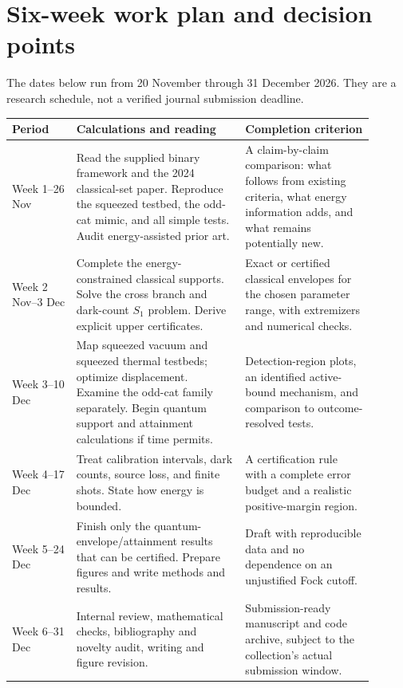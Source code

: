 \documentclass[11pt,a4paper]{article}
\begin{document}
\section{Six-week work plan and decision points}
The dates below run from 20 November through 31 December 2026. They are a
research schedule, not a verified journal submission deadline.

\begin{longtable}{>{\raggedright\arraybackslash}p{0.16\linewidth}>{\raggedright\arraybackslash}p{0.42\linewidth}>{\raggedright\arraybackslash}p{0.32\linewidth}}
\toprule
Period & Calculations and reading & Completion criterion\\
\midrule
\endhead
Week 1\newline 20--26 Nov & Read the supplied binary framework and the 2024
classical-set paper. Reproduce the squeezed testbed, the odd-cat mimic, and all
simple tests. Audit energy-assisted prior art. & A claim-by-claim comparison:
what follows from existing criteria, what energy information adds, and what
remains potentially new.\\
Week 2\newline 27 Nov--3 Dec & Complete the energy-constrained classical
supports. Solve the cross branch and dark-count $S_1$ problem. Derive explicit
upper certificates. & Exact or certified classical envelopes for the chosen
parameter range, with extremizers and numerical checks.\\
Week 3\newline 4--10 Dec & Map squeezed vacuum and squeezed thermal testbeds;
optimize displacement. Examine the odd-cat family separately. Begin quantum
support and attainment calculations if time permits. & Detection-region plots,
an identified active-bound mechanism, and comparison to outcome-resolved tests.\\
Week 4\newline 11--17 Dec & Treat calibration intervals, dark counts, source
loss, and finite shots. State how energy is bounded. & A certification rule
with a complete error budget and a realistic positive-margin region.\\
Week 5\newline 18--24 Dec & Finish only the quantum-envelope/attainment results
that can be certified. Prepare figures and write methods and results. & Draft
with reproducible data and no dependence on an unjustified Fock cutoff.\\
Week 6\newline 25--31 Dec & Internal review, mathematical checks, bibliography
and novelty audit, writing and figure revision. & Submission-ready manuscript
and code archive, subject to the collection's actual submission window.\\
\bottomrule
\end{longtable}
\end{document}
